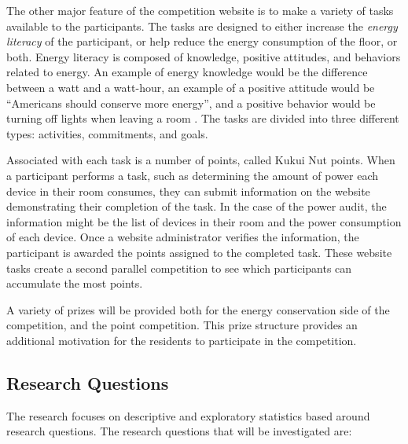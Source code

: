 The other major feature of the competition website is to make a variety of tasks available to the participants. The tasks are designed to either increase the \emph{energy literacy} of the participant, or help reduce the energy consumption of the floor, or both. Energy literacy is composed of knowledge, positive attitudes, and behaviors related to energy. An example of energy knowledge would be the difference between a watt and a watt-hour, an example of a positive attitude would be ``Americans should conserve more energy'', and a positive behavior would be turning off lights when leaving a room \cite{DeWaters09c}. The tasks are divided into three different types: activities, commitments, and goals. 

Associated with each task is a number of points, called Kukui Nut points. When a participant performs a task, such as determining the amount of power each device in their room consumes, they can submit information on the website demonstrating their completion of the task. In the case of the power audit, the information might be the list of devices in their room and the power consumption of each device. Once a website administrator verifies the information, the participant is awarded the points assigned to the completed task. These website tasks create a second parallel competition to see which participants can accumulate the most points.

A variety of prizes will be provided both for the energy conservation side of the competition, and the point competition. This prize structure provides an additional motivation for the residents to participate in the competition.

\subsection{Research Questions}

The research focuses on descriptive and exploratory statistics based around research questions. The research questions that will be investigated are:


